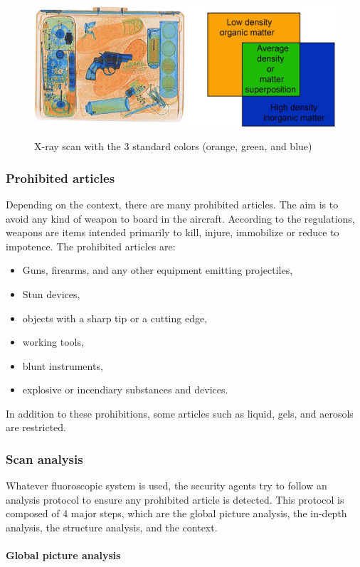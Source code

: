 \begin{figure}
\centering
	\includegraphics[height=5.2cm]{Figures/contour}
	\caption{ X-ray scan with the 3 standard colors (orange, green, and blue)}
	\label{f:image2d}
\end{figure}

\subsubsection{Prohibited articles}
Depending on the context, there are many prohibited articles. The aim is to avoid any kind of weapon to board in the aircraft. According to the regulations, weapons are items intended primarily to kill, injure, immobilize or reduce to impotence. The prohibited articles are:
\begin{itemize}
\item Guns, firearms, and any other equipment emitting projectiles,
\item Stun devices,
\item objects with a sharp tip or a cutting edge,
\item working tools,
\item blunt instruments,
\item explosive or incendiary substances and devices.
\end{itemize}
In addition to these prohibitions, some articles such as liquid, gels, and aerosols are restricted.

\subsubsection{Scan analysis}
Whatever fluoroscopic system is used, the security agents try to follow an analysis protocol to ensure any prohibited article is detected. This protocol is composed of 4 major steps, which are the global picture analysis, the in-depth analysis, the structure analysis, and the context.

\paragraph{Global picture analysis}


